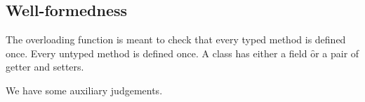 \documentclass[a4paper,USenglish]{tex/lipics-v2016}
\begin{document}
\subsection{Well-formedness}

The overloading function is meant to check that every typed method is
defined once. Every untyped method is defined once. A class has either a
field \f or a pair of getter and setters.


\begin{mathpar}
\end{mathpar}


\begin{mathpar}
\end{mathpar}

We have some auxiliary judgements.

\begin{mathpar}







\end{mathpar}
\end{document}
